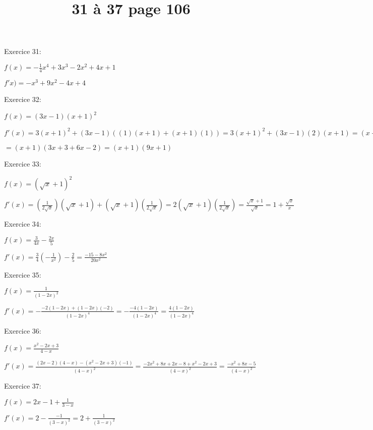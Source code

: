 \documentclass[a4paper,11pt]{article}
\title{31 à 37 page 106}
\author{}
\date{}
\theoremstyle{break}
\begin{document}
\maketitle

Exercice 31:
\vspace{0.25cm}

$f(x)=-\frac{1}{4}x^4+3x^3-2x^2+4x+1$

$f'x)=-x^3+9x^2-4x+4$
\vspace{1cm}

Exercice 32:
\vspace{0.25cm}

$f(x)=(3x-1)(x+1)^2$

$f'(x)=3(x+1)^2+(3x-1)((1)(x+1)+(x+1)(1))=3(x+1)^2+(3x-1)(2)(x+1)=(x+1)(3(x+1)+2(3x-1)$

$=(x+1)(3x+3+6x-2)=(x+1)(9x+1)$
\vspace{1cm}

Exercice 33:
\vspace{0.25cm}

$f(x)=(\sqrt{x}+1)^2$

$f'(x)=(\frac{1}{2\sqrt{x}})(\sqrt{x}+1)+(\sqrt{x}+1)(\frac{1}{2\sqrt{x}})=2(\sqrt{x}+1)(\frac{1}{2\sqrt{x}})
=\frac{\sqrt{x}+1}{\sqrt{x}}=1+\frac{\sqrt{x}}{x}$
\vspace{1cm}

Exercice 34:
\vspace{0.25cm}

$f(x)=\frac{3}{4x}-\frac{2x}{5}$

$f'(x)=\frac{3}{4}(-\frac{1}{x^2})-\frac{2}{5}
=\frac{-15-8x^2}{20x^2}$
\vspace{1cm}

Exercice 35:
\vspace{0.25cm}

$f(x)=\frac{1}{(1-2x)^2}$

$f'(x)=-\frac{-2(1-2x)+(1-2x)(-2)}{(1-2x)^4}
=-\frac{-4(1-2x)}{(1-2x)^4}=\frac{4(1-2x)}{(1-2x)^4}$

\vspace{1cm}

Exercice 36:
\vspace{0.25cm}

$f(x)=\frac{x^2-2x+3}{4-x}$

$f'(x)=\frac{(2x-2)(4-x)-(x^2-2x+3)(-1)}{(4-x)^2}
=\frac{-2x^2+8x+2x-8+x^2-2x+3}{(4-x)^2}
=\frac{-x^2+8x-5}{(4-x)^2}$

\vspace{1cm}

Exercice 37:
\vspace{0.25cm}

$f(x)=2x-1+\frac{1}{3-x}$

$f'(x)=2-\frac{-1}{(3-x)^2}=2+\frac{1}{(3-x)^2}$
\end{document}

